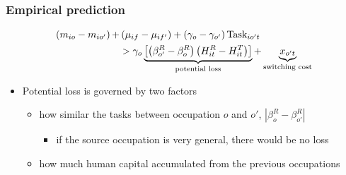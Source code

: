 \documentclass[11pt]{beamer}
\begin{document}
\begin{frame}
	\frametitle{Empirical prediction}
	
\begin{align}	\label{eq:eq10}
	\left(m_{io}-m_{io'} \right) + &\left( \mu_{if}-\mu_{if'}\right)+\left( \gamma_o-\gamma_{o'}\right) \text{Task}_{io't} \\
	&>\gamma_o\underbrace{\left[ \left( \beta_{o'}^R - \beta_{o}^R\right) \left( H_{it}^R-H_{it}^T\right) \right]}_{\text{potential loss}} +  \underbrace{x_{o't}}_{\text{switching cost}} \notag
\end{align}
	
	\begin{itemize}
		\item Potential loss is governed by two factors
		\vspace{1 mm}
		\begin{itemize}
			\item how similar the tasks between occupation $o$ and $o'$, $|\beta_o^R-\beta_{o'}^R|$
			\begin{itemize}
				\item if the source occupation is very general, there would be no loss
			\end{itemize}
		\vspace{1 mm}
			\item how much human capital accumulated from the previous occupations
		\end{itemize}
	
	\end{itemize}
\end{frame}
\end{document}
